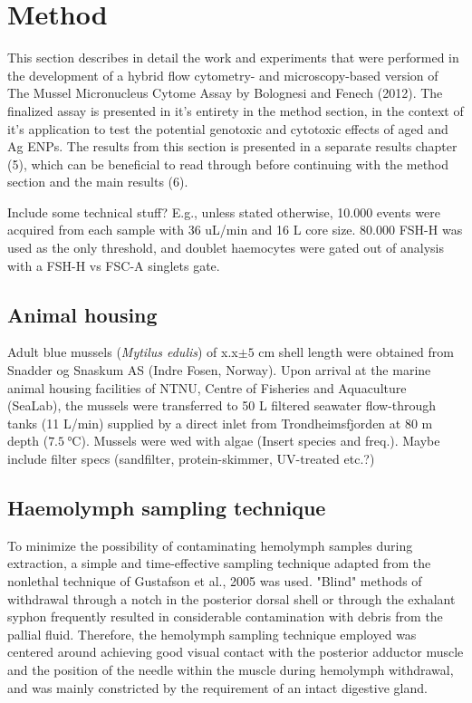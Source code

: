 \section{Method}
This section describes in detail the work and experiments that were performed in the development of a hybrid flow cytometry- and microscopy-based version of The Mussel Micronucleus Cytome Assay by Bolognesi and Fenech (2012). The finalized assay is presented in it's entirety in the method section, in the context of it's application to test the potential genotoxic and cytotoxic effects of aged  and Ag \acrshort{ENPs}. The results from this section is presented in a separate results chapter (5), which can be beneficial to read through before continuing with the method section and the main results (6).

Include some technical stuff? E.g., unless stated otherwise, 10.000 events were acquired from each sample with 36 uL/min and 16 \micro L core size. 80.000 FSH-H was used as the only threshold, and doublet haemocytes were gated out of analysis with a FSH-H vs FSC-A singlets gate.

\subsection{Animal housing}
Adult blue mussels (\emph{Mytilus edulis}) of x.x$\pm{5}$ cm shell length were obtained from Snadder og Snaskum AS (Indre Fosen, Norway). Upon arrival at the marine animal housing facilities of NTNU, Centre of Fisheries and Aquaculture (SeaLab), the mussels were transferred to 50 L filtered seawater flow-through tanks (11 L/min) supplied by a direct inlet from Trondheimsfjorden at 80 m depth ($\SI{7.5}{\celsius}$). Mussels were wed with algae (Insert species and freq.). Maybe include filter specs (sandfilter, protein-skimmer, UV-treated etc.?)

\subsection{Haemolymph sampling technique}
\label{subsection:haemolymph sampling technique}
To minimize the possibility of contaminating hemolymph samples during extraction, a simple and time-effective sampling technique adapted from the nonlethal technique of Gustafson et al., 2005 was used. "Blind" methods of withdrawal through a notch in the posterior dorsal shell or through the exhalant syphon frequently resulted in considerable contamination with debris from the pallial fluid. Therefore, the hemolymph sampling technique employed was centered around achieving good visual contact with the posterior adductor muscle and the position of the needle within the muscle during hemolymph withdrawal, and was mainly constricted by the requirement of an intact digestive gland.

